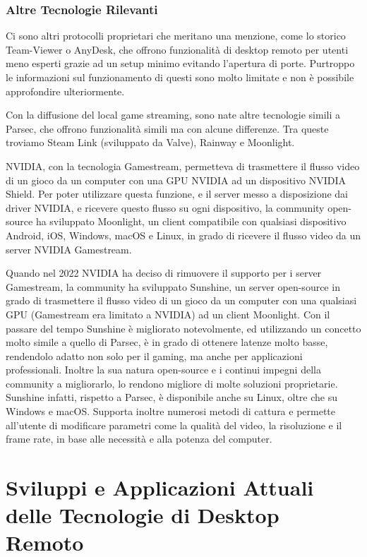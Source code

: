 \documentclass[12pt,a4paper,openright,twoside]{book}
\begin{document}
\subsection{Altre Tecnologie Rilevanti}
Ci sono altri protocolli proprietari che meritano una menzione, come lo storico Team-Viewer o AnyDesk, che offrono funzionalità di desktop remoto per utenti meno esperti grazie ad un setup minimo evitando l'apertura di porte. Purtroppo le informazioni sul funzionamento di questi sono molto limitate e non è possibile approfondire ulteriormente.

Con la diffusione del local game streaming, sono nate altre tecnologie simili a Parsec, che offrono funzionalità simili ma con alcune differenze. Tra queste troviamo Steam Link (sviluppato da Valve), Rainway e Moonlight.

NVIDIA, con la tecnologia Gamestream, permetteva di trasmettere il flusso video di un gioco da un computer con una GPU NVIDIA ad un dispositivo NVIDIA Shield. Per poter utilizzare questa funzione, e il server messo a disposizione dai driver NVIDIA, e ricevere questo flusso su ogni dispositivo, la community open-source ha sviluppato Moonlight, un client compatibile con qualsiasi dispositivo Android, iOS, Windows, macOS e Linux, in grado di ricevere il flusso video da un server NVIDIA Gamestream.

Quando nel 2022 NVIDIA ha deciso di rimuovere il supporto per i server Gamestream, la community ha sviluppato Sunshine, un server open-source in grado di trasmettere il flusso video di un gioco da un computer con una qualsiasi GPU (Gamestream era limitato a NVIDIA) ad un client Moonlight.
Con il passare del tempo Sunshine è migliorato notevolmente, ed utilizzando un concetto molto simile a quello di Parsec, è in grado di ottenere latenze molto basse, rendendolo adatto non solo per il gaming, ma anche per applicazioni professionali. Inoltre la sua natura open-source e i continui impegni della community a migliorarlo, lo rendono migliore di molte soluzioni proprietarie. Sunshine infatti, rispetto a Parsec, è disponibile anche su Linux, oltre che su Windows e macOS. Supporta inoltre numerosi metodi di cattura e permette all'utente di modificare parametri come la qualità del video, la risoluzione e il frame rate, in base alle necessità e alla potenza del computer.


\chapter{Sviluppi e Applicazioni Attuali delle Tecnologie di Desktop Remoto}
\label{chap:current-applications}
\end{document}
